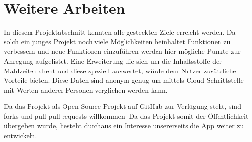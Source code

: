 \documentclass[
    DIV12,
    cleardouble=plain,
    headings=normal,
    pdftex,
    headexclude,footexclude,
    final
]{scrreprt}
\begin{document}
\newpage

\chapter{Weitere Arbeiten}
In diesem Projektabschnitt konnten alle gesteckten Ziele erreicht werden. Da solch ein junges Projekt noch viele Möglichkeiten beinhaltet Funktionen zu verbessern und neue Funktionen einzuführen werden hier mögliche Punkte zur Anregung aufgelistet. 
Eine Erweiterung die sich um die Inhaltsstoffe der Mahlzeiten dreht und diese speziell auswertet, würde dem Nutzer zusätzliche Vorteile bieten. Diese Daten sind anonym genug um mittels Cloud Schnittstelle mit Werten anderer Personen verglichen werden kann.

Da das Projekt als Open Source Projekt auf GitHub zur Verfügung steht, sind forks und pull pull requests willkommen. Da das Projekt somit der Öffentlichkeit übergeben wurde, besteht durchaus ein Interesse unsererseits die App weiter zu entwickeln.


\newpage


\listoffigures
\end{document}
